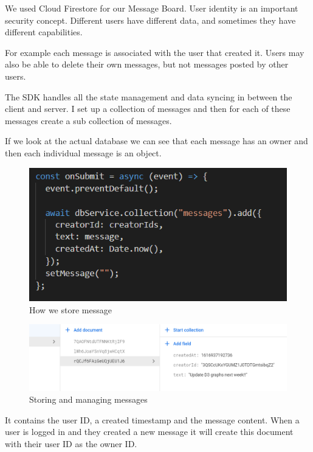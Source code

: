 We used Cloud Firestore for our Message Board.
User identity is an important security concept. Different users have different data, and sometimes they have different capabilities.

For example each message is associated with the user that created it. Users may also be able to delete their own messages, but not messages posted by other users.

The SDK handles all the state management and data syncing in between the client and server. I set up a collection of messages and then for each of these messages create a sub collection of messages.

If we look at the actual database we can see that each message has an owner and then each individual message is an object.

\begin{figure}
    \centering
    \includegraphics[scale=0.75]{img/message.PNG}
    \caption{How we store message}
    \label{fig:my_label4}
\end{figure}

\begin{figure}
    \centering
    \includegraphics[scale=0.6]{img/FirestoreMessage.PNG}
    \caption{Storing and managing messages}
    \label{fig:my_label4}
\end{figure}

It contains the user ID, a created timestamp and the message content.
When a user is logged in and they created a new message it will create this document with their user ID as the owner ID.

